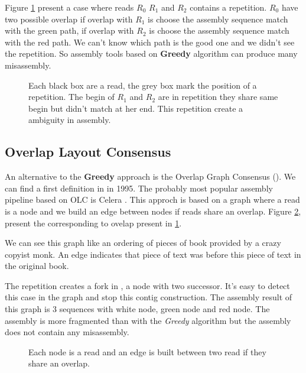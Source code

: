 \documentclass[main]{subfiles}
\begin{document}
Figure \ref{intro:fig:greedy:repetition} present a case where reads $R_0$ $R_1$ and $R_2$ contains a repetition. $R_0$ have two possible overlap if overlap with $R_1$ is choose the assembly sequence match with the green path, if overlap with $R_2$ is choose the assembly sequence match with the red path. We can't know which path is the good one and we didn't see the repetition. So assembly tools based on \textbf{Greedy} algorithm can produce many misassembly. 

\begin{figure}[ht]
    \centering 
    
    \caption{Each black box are a read, the grey box mark the position of a repetition. The begin of $R_1$ and $R_2$ are in repetition they share same begin but didn't match at her end. This repetition create a ambiguity in assembly.}
    \label{intro:fig:greedy:repetition}
\end{figure}

\subsection{Overlap Layout Consensus} \label{intro:subsec:OLC}

An alternative to the \textbf{Greedy} approach is the Overlap Graph Consensus (\OLC). We can find a first \OLC definition in \cite{OLC_myers} in 1995. The probably most popular assembly pipeline based on OLC is Celera \cite{celera_first, celera_second}. This approch is based on a graph where a read is a node and we build an edge between nodes if reads share an overlap. Figure \ref{intro:fig:olc:graph}, present the \OLC corresponding to ovelap present in \ref{intro:fig:greedy:repetition}.

We can see this graph like an ordering of pieces of book provided by a crazy copyist monk. An edge indicates that piece of text was before this piece of text in the original book.

The repetition creates a fork in \OLC, a node with two successor. It's easy to detect this case in the graph and stop this contig construction. The assembly result of this graph is 3 sequences with white node, green node and red node. The assembly is more fragmented than with the \textit{Greedy} algorithm but the assembly does not contain any misassembly.

\begin{figure}[ht]
    \centering 
    
    \caption{Each node is a read and an edge is built between two read if they share an overlap.}
    \label{intro:fig:olc:graph}
\end{figure}
\end{document}
